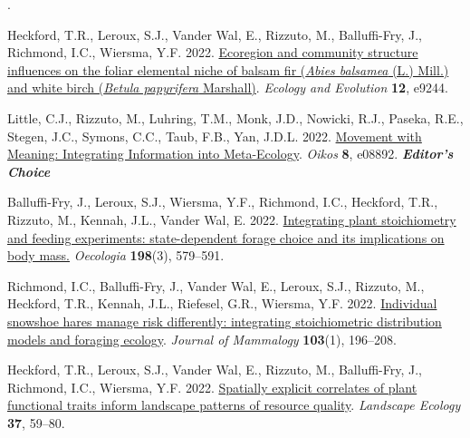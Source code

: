 
. 


\begin{etaremune}
  \renewcommand\labelenumi{\bfseries\theenumi .}
  \item Heckford, T.R., Leroux, S.J., Vander Wal, E., \textcolor{awesome}{Rizzuto, M.}, Balluffi-Fry, J., Richmond, I.C., Wiersma, Y.F. 2022. \href{https://doi.org/10.1002/ece3.9244}{Ecoregion and community structure influences on the foliar elemental niche of balsam fir (\textit{Abies balsamea} (L.) Mill.) and white birch (\textit{Betula papyrifera} Marshall)}. \emph{Ecology and Evolution} \textbf{12}, e9244. 
  \item Little, C.J.\textsuperscript{\textdagger}, \textcolor{awesome}{Rizzuto, M.}\textsuperscript{\textdagger}, Luhring, T.M., Monk, J.D., Nowicki, R.J., Paseka, R.E., Stegen, J.C., Symons, C.C., Taub, F.B., Yan, J.D.L. 2022. \href{https://doi.org/10.1111/oik.08892}{Movement with Meaning: Integrating Information into Meta-Ecology}. \emph{Oikos} \textbf{8}, e08892. \null\hfill\textbf{\textit{Editor's Choice}}
  \item Balluffi-Fry, J., Leroux, S.J., Wiersma, Y.F., Richmond, I.C., Heckford, T.R., \textcolor{awesome}{Rizzuto, M.}, Kennah, J.L., Vander Wal, E. 2022. \href{https://rdcu.be/cAY5a}{Integrating plant stoichiometry and feeding experiments: state-dependent forage choice and its implications on body mass.} \emph{Oecologia} \textbf{198}(3), 579--591.
  \item Richmond, I.C., Balluffi-Fry, J., Vander Wal, E., Leroux, S.J., \textcolor{awesome}{Rizzuto, M.}, Heckford, T.R., Kennah, J.L., Riefesel, G.R., Wiersma, Y.F. 2022. \href{https://academic.oup.com/jmammal/advance-article/doi/10.1093/jmammal/gyab130/6441781?guestAccessKey=8f89e422-7fb9-4ce9-a9dc-ccf46f3dd0cc}{Individual snowshoe hares manage risk differently: integrating stoichiometric distribution models and foraging ecology}. \emph{Journal of Mammalogy} \textbf{103}(1), 196--208.
  \item Heckford, T.R., Leroux, S.J., Vander Wal, E., \textcolor{awesome}{Rizzuto, M.}, Balluffi-Fry, J., Richmond, I.C., Wiersma, Y.F. 2022. \href{https://doi.org/10.1007/s10980-021-01334-3}{Spatially explicit correlates of plant functional traits inform landscape patterns of resource quality}. \emph{Landscape Ecology} \textbf{37}, 59--80.

\end{etaremune}
